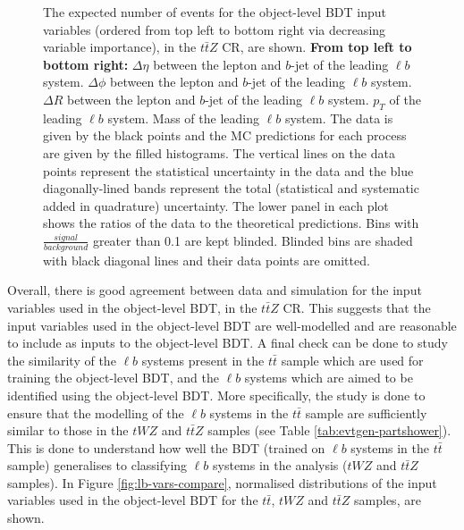 \begin{figure}[htbp]
\caption{The expected number of events for the object-level BDT input variables (ordered from top left to bottom right via decreasing variable importance), in the $t\bar{t}Z$ CR, are shown. \textbf{From top left to bottom right:} $\Delta \eta$ between the lepton and $b$-jet of the leading $\ell b$ system. $\Delta \phi$ between the lepton and $b$-jet of the leading $\ell b$ system. $\Delta R$ between the lepton and $b$-jet of the leading $\ell b$ system. $p_{T}$ of the leading $\ell b$ system. Mass of the leading $\ell b$ system. The data is given by the black points and the MC predictions for each process are given by the filled histograms. The vertical lines on the data points represent the statistical uncertainty in the data and the blue diagonally-lined bands represent the total (statistical and systematic added in quadrature) uncertainty. The lower panel in each plot shows the ratios of the data to the theoretical predictions. Bins with $\frac{signal}{background}$ greater than 0.1 are kept blinded. Blinded bins are shaded with black diagonal lines and their data points are omitted. }
  \label{fig:4lep-ttZCR-objectbdt-vars}
\end{figure}

Overall, there is good agreement between data and simulation for the input variables used in the object-level BDT, in the $t\bar{t}Z$ CR. This suggests that the input variables used in the object-level BDT are well-modelled and are reasonable to include as inputs to the object-level BDT. A final check can be done to study the similarity of the $\ell b$ systems present in the $t\bar{t}$ sample which are used for training the object-level BDT, and the $\ell b$ systems which are aimed to be identified using the object-level BDT. More specifically, the study is done to ensure that the modelling of the $\ell b$ systems in the $t\bar{t}$ sample are sufficiently similar to those in the $tWZ$ and $t\bar{t}Z$ samples (see Table \ref{tab:evtgen-partshower}). This is done to understand how well the BDT (trained on $\ell b$ systems in the $t\bar{t}$ sample) generalises to classifying $\ell b$ systems in the analysis ($tWZ$ and $t\bar{t}Z$ samples). In Figure \ref{fig:lb-vars-compare}, normalised distributions of the input variables used in the object-level BDT for the $t\bar{t}$, $tWZ$ and $t\bar{t}Z$ samples, are shown.


